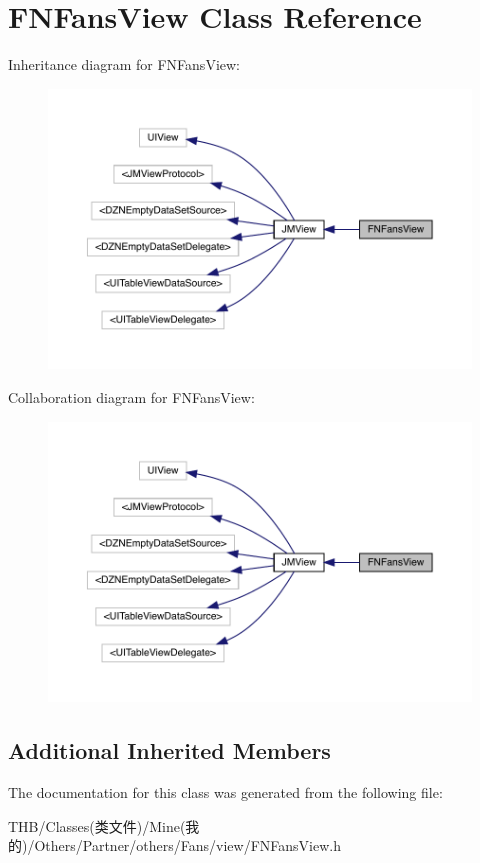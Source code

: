 \hypertarget{interface_f_n_fans_view}{}\section{F\+N\+Fans\+View Class Reference}
\label{interface_f_n_fans_view}


Inheritance diagram for F\+N\+Fans\+View\+:\nopagebreak
\begin{figure}[H]
\begin{center}
\leavevmode
\includegraphics[width=350pt]{interface_f_n_fans_view__inherit__graph}
\end{center}
\end{figure}


Collaboration diagram for F\+N\+Fans\+View\+:\nopagebreak
\begin{figure}[H]
\begin{center}
\leavevmode
\includegraphics[width=350pt]{interface_f_n_fans_view__coll__graph}
\end{center}
\end{figure}
\subsection*{Additional Inherited Members}


The documentation for this class was generated from the following file\+:\begin{DoxyCompactItemize}
\item 
T\+H\+B/\+Classes(类文件)/\+Mine(我的)/\+Others/\+Partner/others/\+Fans/view/F\+N\+Fans\+View.\+h\end{DoxyCompactItemize}
